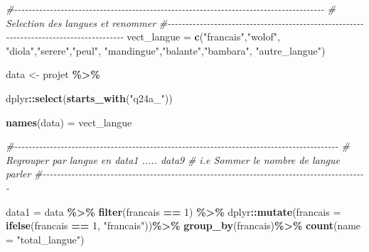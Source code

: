 \documentclass[
]{article}
\newenvironment{Shaded}{\begin{snugshade}}{\end{snugshade}}
\newcommand{\AttributeTok}[1]{\textcolor[rgb]{0.13,0.29,0.53}{#1}}
\newcommand{\CommentTok}[1]{\textcolor[rgb]{0.56,0.35,0.01}{\textit{#1}}}
\newcommand{\DecValTok}[1]{\textcolor[rgb]{0.00,0.00,0.81}{#1}}
\newcommand{\FunctionTok}[1]{\textcolor[rgb]{0.13,0.29,0.53}{\textbf{#1}}}
\newcommand{\NormalTok}[1]{#1}
\newcommand{\OtherTok}[1]{\textcolor[rgb]{0.56,0.35,0.01}{#1}}
\newcommand{\SpecialCharTok}[1]{\textcolor[rgb]{0.81,0.36,0.00}{\textbf{#1}}}
\newcommand{\StringTok}[1]{\textcolor[rgb]{0.31,0.60,0.02}{#1}}
\begin{document}
\begin{Shaded}
\begin{Highlighting}[]
\CommentTok{\#{-}{-}{-}{-}{-}{-}{-}{-}{-}{-}{-}{-}{-}{-}{-}{-}{-}{-}{-}{-}{-}{-}{-}{-}{-}{-}{-}{-}{-}{-}{-}{-}{-}{-}{-}{-}{-}{-}{-}{-}{-}{-}{-}{-}{-}{-}{-}{-}{-}{-}{-}{-}{-}{-}{-}{-}{-}{-}{-}{-}{-}{-}{-}{-}{-}{-}{-}{-}{-}{-}{-}{-}{-}{-}{-}{-}{-}{-}{-}{-}{-}{-}{-}{-}{-}{-}{-}}
\CommentTok{\#               Selection des langues et renommer }
\CommentTok{\#{-}{-}{-}{-}{-}{-}{-}{-}{-}{-}{-}{-}{-}{-}{-}{-}{-}{-}{-}{-}{-}{-}{-}{-}{-}{-}{-}{-}{-}{-}{-}{-}{-}{-}{-}{-}{-}{-}{-}{-}{-}{-}{-}{-}{-}{-}{-}{-}{-}{-}{-}{-}{-}{-}{-}{-}{-}{-}{-}{-}{-}{-}{-}{-}{-}{-}{-}{-}{-}{-}{-}{-}{-}{-}{-}{-}{-}{-}{-}{-}{-}{-}{-}{-}{-}{-}{-}{-}}
\NormalTok{vect\_langue }\OtherTok{=} \FunctionTok{c}\NormalTok{(}\StringTok{"francais"}\NormalTok{,}\StringTok{"wolof"}\NormalTok{,}
              \StringTok{"diola"}\NormalTok{,}\StringTok{"serere"}\NormalTok{,}\StringTok{"peul"}\NormalTok{,}
              \StringTok{"mandingue"}\NormalTok{,}\StringTok{"balante"}\NormalTok{,}\StringTok{"bambara"}\NormalTok{,}
              \StringTok{"autre\_langue"}\NormalTok{)}



\NormalTok{data }\OtherTok{\textless{}{-}}\NormalTok{ projet }\SpecialCharTok{\%\textgreater{}\%}
  
\NormalTok{  dplyr}\SpecialCharTok{::}\FunctionTok{select}\NormalTok{(}\FunctionTok{starts\_with}\NormalTok{(}\StringTok{"q24a\_"}\NormalTok{))}

\FunctionTok{names}\NormalTok{(data) }\OtherTok{=}\NormalTok{ vect\_langue}


\CommentTok{\#{-}{-}{-}{-}{-}{-}{-}{-}{-}{-}{-}{-}{-}{-}{-}{-}{-}{-}{-}{-}{-}{-}{-}{-}{-}{-}{-}{-}{-}{-}{-}{-}{-}{-}{-}{-}{-}{-}{-}{-}{-}{-}{-}{-}{-}{-}{-}{-}{-}{-}{-}{-}{-}{-}{-}{-}{-}{-}{-}{-}{-}{-}{-}{-}{-}{-}{-}{-}{-}{-}{-}{-}{-}{-}{-}{-}{-}{-}{-}{-}{-}{-}{-}{-}{-}{-}{-}{-}{-}{-}{-}}
\CommentTok{\#  Regrouper par langue en data1 ..... data9 }
\CommentTok{\#      i.e  Sommer le nombre de langue parler}
\CommentTok{\#{-}{-}{-}{-}{-}{-}{-}{-}{-}{-}{-}{-}{-}{-}{-}{-}{-}{-}{-}{-}{-}{-}{-}{-}{-}{-}{-}{-}{-}{-}{-}{-}{-}{-}{-}{-}{-}{-}{-}{-}{-}{-}{-}{-}{-}{-}{-}{-}{-}{-}{-}{-}{-}{-}{-}{-}{-}{-}{-}{-}{-}{-}{-}{-}{-}{-}{-}{-}{-}{-}{-}{-}{-}{-}{-}{-}{-}{-}{-}{-}{-}{-}{-}{-}{-}{-}{-}{-}{-}{-}{-}}

\NormalTok{data1 }\OtherTok{=}\NormalTok{  data }\SpecialCharTok{\%\textgreater{}\%}
\FunctionTok{filter}\NormalTok{(francais }\SpecialCharTok{==} \DecValTok{1}\NormalTok{) }\SpecialCharTok{\%\textgreater{}\%} 
\NormalTok{  dplyr}\SpecialCharTok{::}\FunctionTok{mutate}\NormalTok{(}\AttributeTok{francais =} \FunctionTok{ifelse}\NormalTok{(francais }\SpecialCharTok{==} \DecValTok{1}\NormalTok{, }\StringTok{"francais"}\NormalTok{))}\SpecialCharTok{\%\textgreater{}\%}
  \FunctionTok{group\_by}\NormalTok{(francais)}\SpecialCharTok{\%\textgreater{}\%}  
  \FunctionTok{count}\NormalTok{(}\AttributeTok{name =} \StringTok{"total\_langue"}\NormalTok{)}


\end{Highlighting}
\end{Shaded}
\end{document}
